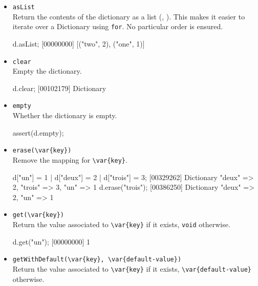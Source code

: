 \begin{itemize}
\item \lstinline|asList|\\
  Return the contents of the dictionary as a  list
  (, ).  This makes it easier to iterate over a
  Dictionary using \lstinline|for|.  No particular order is ensured.

\begin{urbiscript}[firstnumber=last]
d.asList;
[00000000] [("two", 2), ("one", 1)]
\end{urbiscript}

\item \lstinline|clear|\\
  Empty the dictionary.

\begin{urbiscript}[firstnumber=last]
d.clear;
[00102179] Dictionary {}
\end{urbiscript}

\item \lstinline|empty|\\
  Whether the dictionary is empty.

\begin{urbiscript}[firstnumber=last]
assert(d.empty);
\end{urbiscript}

\item \lstinline|erase(\var{key})|\\
  Remove the mapping for \lstinline|\var{key}|.

\begin{urbiscript}[firstnumber=last]
d["un"] = 1 | d["deux"] = 2 | d["trois"] = 3;
[00329262] Dictionary {"deux" => 2, "trois" => 3, "un" => 1}
d.erase("trois");
[00386250] Dictionary {"deux" => 2, "un" => 1}
\end{urbiscript}

\item \lstinline|get(\var{key})|\\
  Return the value associated to  \lstinline|\var{key}| if it exists,
  \lstinline|void| otherwise.

\begin{urbiscript}[firstnumber=last]
d.get("un");
[00000000] 1
\end{urbiscript}


\item \lstinline|getWithDefault(\var{key}, \var{default-value})|\\
  Return the value associated to  \lstinline|\var{key}| if it exists,
  \lstinline|\var{default-value}| otherwise.


\end{itemize}
